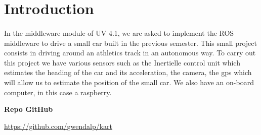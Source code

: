 \section{Introduction}
\paragraph{}In the middleware module of UV 4.1, we are asked to implement the ROS middleware to drive a small car built in the previous semester. 
This small project consists in driving around an athletics track in an autonomous way. 
To carry out this project we have various sensors such as the Inertielle control unit which estimates the heading of the car and its acceleration, the camera, 
the gps which will allow us to estimate the position of the small car. We also have an on-board computer, in this case a raspberry.

\textbf{Repo GitHub}

\url{https://github.com/gwendalp/kart}

\newpage